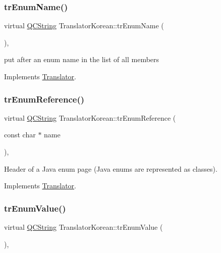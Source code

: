 \subsubsection{\texorpdfstring{trEnumName()}{trEnumName()}}
{\footnotesize\ttfamily virtual \mbox{\hyperlink{class_q_c_string}{Q\+C\+String}} Translator\+Korean\+::tr\+Enum\+Name (\begin{DoxyParamCaption}{ }\end{DoxyParamCaption})\hspace{0.3cm}{\ttfamily [inline]}, {\ttfamily [virtual]}}

put after an enum name in the list of all members 

Implements \mbox{\hyperlink{class_translator}{Translator}}.

\mbox{\label{class_translator_korean_aa8db9bd724d8a6d8ff8ac1cc227c929a}} 
\subsubsection{\texorpdfstring{trEnumReference()}{trEnumReference()}}
{\footnotesize\ttfamily virtual \mbox{\hyperlink{class_q_c_string}{Q\+C\+String}} Translator\+Korean\+::tr\+Enum\+Reference (\begin{DoxyParamCaption}\item[{const char $\ast$}]{name }\end{DoxyParamCaption})\hspace{0.3cm}{\ttfamily [inline]}, {\ttfamily [virtual]}}

Header of a Java enum page (Java enums are represented as classes). 

Implements \mbox{\hyperlink{class_translator}{Translator}}.

\mbox{\label{class_translator_korean_a6f0da64b700565a28d3d77b845be2c92}} 
\subsubsection{\texorpdfstring{trEnumValue()}{trEnumValue()}}
{\footnotesize\ttfamily virtual \mbox{\hyperlink{class_q_c_string}{Q\+C\+String}} Translator\+Korean\+::tr\+Enum\+Value (\begin{DoxyParamCaption}{ }\end{DoxyParamCaption})\hspace{0.3cm}{\ttfamily [inline]}, {\ttfamily [virtual]}}

